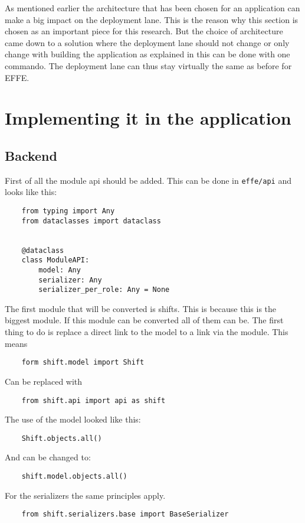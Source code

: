 As mentioned earlier the architecture that has been chosen for an application can make a big impact on the deployment lane. This is the reason why this section is chosen as an important piece for this research. But the choice of architecture came down to a solution where the deployment lane should not change or only change with building the application as explained in  this can be done with one commando. The deployment lane can thus stay virtually the same as before for EFFE.

\section{Implementing it in the application}

\subsection{Backend}

First of all the module api should be added. This can be done in \texttt{effe/api} and looks like this:
\begin{verbatim}
    from typing import Any
    from dataclasses import dataclass


    @dataclass
    class ModuleAPI:
        model: Any
        serializer: Any
        serializer_per_role: Any = None
\end{verbatim}

The first module that will be converted is shifts. This is because this is the biggest module. If this module can be converted all of them can be. The first thing to do is replace a direct link to the model to a link via the module. This means
\begin{verbatim}
    form shift.model import Shift
\end{verbatim}

Can be replaced with
\begin{verbatim}
    from shift.api import api as shift
\end{verbatim}

The use of the model looked like this:
\begin{verbatim}
    Shift.objects.all()
\end{verbatim}

And can be changed to:
\begin{verbatim}
    shift.model.objects.all()
\end{verbatim}

For the serializers the same principles apply.
\begin{verbatim}
    from shift.serializers.base import BaseSerializer
\end{verbatim}

